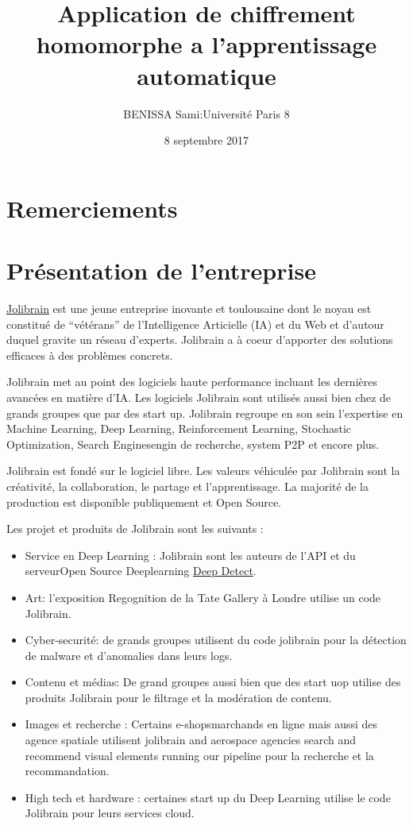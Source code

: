 \documentclass[a4paper,12pt]{article}
\title{Application de chiffrement homomorphe a l'apprentissage automatique}
\author{BENISSA Sami\quad:\quad Université Paris 8}
\date{8 septembre 2017}
\begin{document}
\maketitle
\newpage
\renewcommand{\chaptername}{}
\tableofcontents

\newpage
\section*{Remerciements}
\newpage
\section{Présentation de l’entreprise}
\href{http://jolibrain.com/}{Jolibrain} est une jeune entreprise inovante et toulousaine dont le noyau est constitué de ``vétérans'' de l'Intelligence Articielle (IA) et du Web et d'autour duquel gravite un réseau d'experts.
Jolibrain a à coeur d'apporter des solutions efficaces à des problèmes concrets.

Jolibrain met au point des logiciels haute performance incluant les dernières avancées en matière d'IA. Les logiciels Jolibrain sont utilisés aussi bien chez de grands groupes que par des start up. Jolibrain regroupe en son sein l'expertise en  Machine Learning, Deep Learning, Reinforcement Learning, Stochastic Optimization, Search Enginesengin de recherche, system P2P et encore plus.

Jolibrain est fondé sur le logiciel libre. Les valeurs véhiculée par Jolibrain sont la créativité, la collaboration, le  partage et l'apprentissage. La majorité de la production est disponible publiquement et Open Source.

Les projet et produits de Jolibrain sont les suivants :
\begin{itemize}
\item   Service en Deep Learning :
  Jolibrain sont les auteurs de l'API  et du serveurOpen Source Deeplearning \href{https://github.com/beniz/deepdetect}{Deep Detect}.
\item Art: l'exposition Regognition de la Tate Gallery à Londre utilise un code Jolibrain.
\item
Cyber-securité: de grands groupes utilisent du code jolibrain pour la détection de malware et d'anomalies dans leurs logs.
\item
Contenu et médias: De grand groupes aussi bien que des start uop utilise des produits Jolibrain pour le filtrage et la modération de contenu.
\item
Images et recherche : Certains e-shopsmarchands en ligne mais aussi des agence spatiale utilisent jolibrain and aerospace agencies search and recommend visual elements running our pipeline pour la recherche et la recommandation.
\item
High tech et hardware : certaines start up du Deep Learning utilise le code Jolibrain pour leurs services cloud.
\end{itemize}
\end{document}
